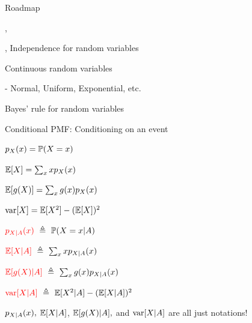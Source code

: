 \documentclass[fleqn,aspectratio=169]{beamer}
\begin{document}
\begin{frame}{Roadmap}

\plitemsep 0.1in

\bci [$\circ$]
\item {}

\item {}

\item {},  

\item {}, Independence for random variables 

\item Continuous random variables

- Normal, Uniform, Exponential, etc. 

\item Bayes' rule for random variables
\eci 

\end{frame}

\begin{frame}{Conditional PMF: Conditioning on an event}


\medskip

{
\plitemsep 0.2in
\bci 

\item<2-> $p_X(x) = \mathbb{P}( X=x )$

\item<3-> $\mathbb{E}[ X ] = \sum_x x p_X(x)$

\item<4-> $\mathbb{E}[ g(X) ] = \sum_x g(x) p_X(x)$

\item<5-> $\text{var}[ X ] = \mathbb{E}[ X^2 ] - (\mathbb{E}[ X ])^2$
\eci 
}
{
\plitemsep 0.2in
\bci 

\item<2-> ${\color{red} p_{X|A}(x)} \ \triangleq \ \mathbb{P}( X=x | A )$ 

\item<3-> ${\color{red} \mathbb{E}[ X | A ]} \ \triangleq \ \sum_x x p_{X|A}(x)$

\item<4-> ${\color{red} \mathbb{E}[ g(X) | A ]} \ \triangleq \ \sum_x g(x) p_{X|A}(x)$

\item<5-> ${\color{red} \text{var}[ X | A ]} \ \triangleq \ \mathbb{E}[ X^2 |A  ] - (\mathbb{E}[ X|A ])^2$

\medskip
\item<6->  $p_{X|A}(x),$ $\mathbb{E}[ X | A ]$, $\mathbb{E}[ g(X) | A ],$ and $\text{var}[ X |A ]$ are all just notations! 

\eci 
}

\end{frame}
\end{document}

